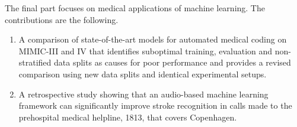 %
The final part focuses on medical applications of machine learning. The contributions are the following.
%
\begin{enumerate}[resume, label=(\roman*)] 
    \item A comparison of state-of-the-art models for automated medical coding on MIMIC-III and IV that identifies suboptimal training, evaluation and non-stratified data splits as causes for poor performance and provides a revised comparison using new data splits and identical experimental setups. 
    \item A retrospective study showing that an audio-based machine learning framework can significantly improve stroke recognition in calls made to the prehospital medical helpline, 1813, that covers Copenhagen. 
\end{enumerate}
%
